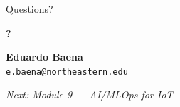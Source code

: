 \documentclass[aspectratio=169,11pt]{beamer}
\begin{document}
\begin{frame}{Questions?}
    \begin{center}
        \Huge\textbf{?}

        \vspace{1cm}
        \normalsize
        \textbf{Eduardo Baena}\\
        \texttt{e.baena@northeastern.edu}

        \vspace{0.5cm}
        \textit{Next: Module 9 --- AI/MLOps for IoT}
    \end{center}
\end{frame}
\end{document}
